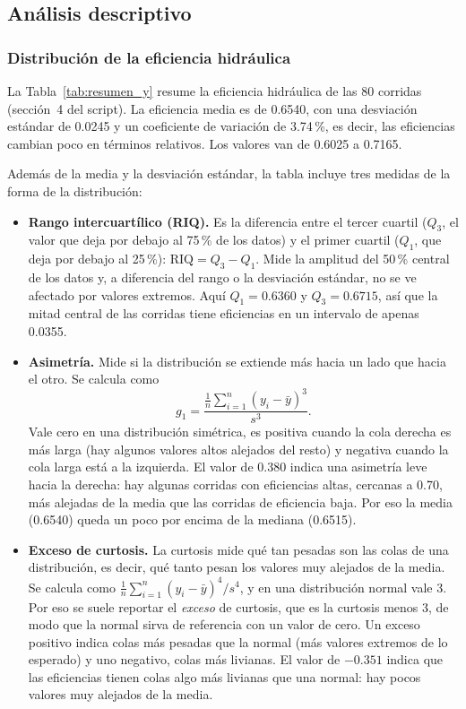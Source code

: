 \subsection{Análisis descriptivo}
\label{sec:descriptivo}

\subsubsection{Distribución de la eficiencia hidráulica}

La Tabla~\ref{tab:resumen_y} resume la eficiencia hidráulica de las 80 corridas (sección~4 del script). La eficiencia media es de 0.6540, con una desviación estándar de 0.0245 y un coeficiente de variación de 3.74\,\%, es decir, las eficiencias cambian poco en términos relativos. Los valores van de 0.6025 a 0.7165.

Además de la media y la desviación estándar, la tabla incluye tres medidas de la forma de la distribución:

\begin{itemize}[leftmargin=*, itemsep=2pt]
  \item \textbf{Rango intercuartílico (RIQ).} Es la diferencia entre el tercer cuartil ($Q_3$, el valor que deja por debajo al 75\,\% de los datos) y el primer cuartil ($Q_1$, que deja por debajo al 25\,\%): $\text{RIQ} = Q_3 - Q_1$. Mide la amplitud del 50\,\% central de los datos y, a diferencia del rango o la desviación estándar, no se ve afectado por valores extremos. Aquí $Q_1 = 0.6360$ y $Q_3 = 0.6715$, así que la mitad central de las corridas tiene eficiencias en un intervalo de apenas 0.0355.

  \item \textbf{Asimetría.} Mide si la distribución se extiende más hacia un lado que hacia el otro. Se calcula como
  \[
  g_1 = \frac{\frac{1}{n}\sum_{i=1}^{n}(y_i-\bar{y})^3}{s^3}.
  \]
  Vale cero en una distribución simétrica, es positiva cuando la cola derecha es más larga (hay algunos valores altos alejados del resto) y negativa cuando la cola larga está a la izquierda. El valor de 0.380 indica una asimetría leve hacia la derecha: hay algunas corridas con eficiencias altas, cercanas a 0.70, más alejadas de la media que las corridas de eficiencia baja. Por eso la media (0.6540) queda un poco por encima de la mediana (0.6515).

  \item \textbf{Exceso de curtosis.} La curtosis mide qué tan pesadas son las colas de una distribución, es decir, qué tanto pesan los valores muy alejados de la media. Se calcula como $\frac{1}{n}\sum_{i=1}^{n}(y_i-\bar{y})^4 / s^4$, y en una distribución normal vale 3. Por eso se suele reportar el \emph{exceso} de curtosis, que es la curtosis menos 3, de modo que la normal sirva de referencia con un valor de cero. Un exceso positivo indica colas más pesadas que la normal (más valores extremos de lo esperado) y uno negativo, colas más livianas. El valor de $-0.351$ indica que las eficiencias tienen colas algo más livianas que una normal: hay pocos valores muy alejados de la media.
\end{itemize}


